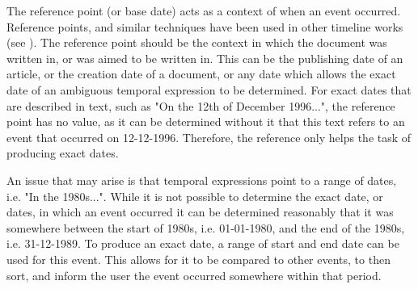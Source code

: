 \par The reference point (or base date) acts as a context of when an event occurred. Reference points, and similar techniques have been used in other timeline works (see \cite{mccloskymanning2012}). The reference point should be the context in which the document was written in, or was aimed to be written in. This can be the publishing date of an article, or the creation date of a document, or any date which allows the exact date of an ambiguous temporal expression to be determined. For exact dates that are described in text, such as "On the 12th of December 1996...", the reference point has no value, as it can be determined without it that this text refers to an event that occurred on 12-12-1996. Therefore, the reference only helps the task of producing exact dates.

\par An issue that may arise is that temporal expressions point to a range of dates, i.e. "In the 1980s...". While it is not possible to determine the exact date, or dates, in which an event occurred it can be determined reasonably \cite{mccloskymanning2012} that it was somewhere between the start of 1980s, i.e. 01-01-1980, and the end of the 1980s, i.e. 31-12-1989. To produce an exact date, a range of start and end date can be used for this event. This allows for it to be compared to other events, to then sort, and inform the user the event occurred somewhere within that period. 


